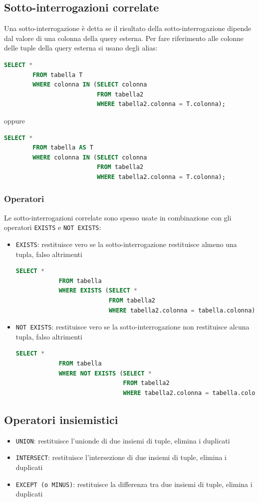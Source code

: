 \documentclass[12pt, a4paper]{report}
\begin{document}
    \subsection{Sotto-interrogazioni correlate}
    Una sotto-interrogazione è detta  se il risultato della sotto-interrogazione dipende dal valore di una colonna della query esterna. Per fare riferimento alle colonne delle tuple della query esterna si usano degli alias:
    \begin{lstlisting}[language=SQL]
        SELECT *
        FROM tabella T
        WHERE colonna IN (SELECT colonna
                          FROM tabella2
                          WHERE tabella2.colonna = T.colonna);
    \end{lstlisting}
    oppure
    \begin{lstlisting}[language=SQL]
        SELECT *
        FROM tabella AS T
        WHERE colonna IN (SELECT colonna
                          FROM tabella2
                          WHERE tabella2.colonna = T.colonna);
    \end{lstlisting}
    \subsubsection{Operatori}
    Le sotto-interrogazioni correlate sono spesso usate in combinazione con gli operatori \texttt{EXISTS} e \texttt{NOT EXISTS}:
    \begin{itemize}
        \item \texttt{EXISTS}: restituisce vero se la sotto-interrogazione restituisce almeno una tupla, falso altrimenti \begin{lstlisting}[language=SQL]
            SELECT *
            FROM tabella
            WHERE EXISTS (SELECT *
                          FROM tabella2
                          WHERE tabella2.colonna = tabella.colonna);
        \end{lstlisting}
        \item \texttt{NOT EXISTS}: restituisce vero se la sotto-interrogazione non restituisce alcuna tupla, falso altrimenti \begin{lstlisting}[language=SQL]
            SELECT *
            FROM tabella
            WHERE NOT EXISTS (SELECT *
                              FROM tabella2
                              WHERE tabella2.colonna = tabella.colonna);
        \end{lstlisting}
    \end{itemize}
    \subsection{Operatori insiemistici}
    \begin{itemize}
        \item \texttt{UNION}: restituisce l'unionde di due insiemi di tuple, elimina i duplicati
        \item \texttt{INTERSECT}: restituisce l'intersezione di due insiemi di tuple, elimina i duplicati
        \item \texttt{EXCEPT (o MINUS)}: restituisce la differenza tra due insiemi di tuple, elimina i duplicati
    \end{itemize}
\end{document}

